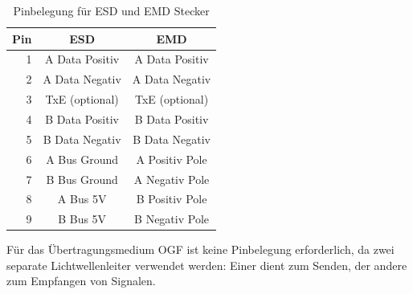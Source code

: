 \begin{table}[H]
    \centering
    \begin{tabular}{|r||c|c|} \hline
        Pin & ESD & EMD\\ \hline
        1 & A Data Positiv & A Data Positiv\\ \hline
        2 & A Data Negativ & A Data Negativ\\ \hline
        3 & TxE (optional) & TxE (optional)\\ \hline
        4 & B Data Positiv & B Data Positiv\\ \hline
        5 & B Data Negativ & B Data Negativ\\ \hline
        6 & A Bus Ground & A Positiv Pole\\ \hline
        7 & B Bus Ground & A Negativ Pole\\ \hline
        8 & A Bus 5V & B Positiv Pole\\ \hline
        9 & B Bus 5V & B Negativ Pole\\ \hline
    \end{tabular}
    \caption{Pinbelegung für ESD und EMD Stecker}
    \label{tab:PinESDEMD}
\end{table}

Für das Übertragungsmedium OGF ist keine Pinbelegung erforderlich, da zwei separate Lichtwellenleiter verwendet werden: Einer dient zum Senden, der andere zum Empfangen von Signalen.